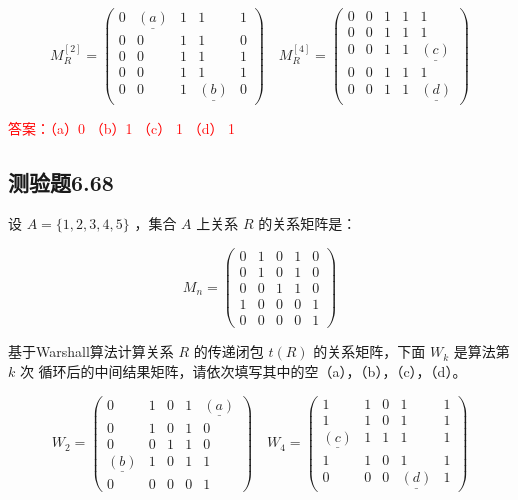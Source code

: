 \documentclass[UTF8, heading=true]{ctexart}
\begin{document}
$$
M_R^{[2]}=\left(\begin{array}{ccccc}
0 & \underline{(a)} & 1 & 1 & 1 \\
0 & 0 & 1 & 1 & 0 \\
0 & 0 & 1 & 1 & 1 \\
0 & 0 & 1 & 1 & 1 \\
0 & 0 & 1 & \underline{(b)} & 0
\end{array}\right) \quad M_R^{[4]}=\left(\begin{array}{ccccc}
0 & 0 & 1 & 1 & 1 \\
0 & 0 & 1 & 1 & 1 \\
0 & 0 & 1 & 1 & \underline{(c)} \\
0 & 0 & 1 & 1 & 1 \\
0 & 0 & 1 & 1 & \underline{(d)}
\end{array}\right)
$$

\textcolor{red}{答案：（a）0 （b）1 （c） 1 （d） 1}

\subsection{测验题6.68}

设 $A=\{1,2,3,4,5\}$ ，集合 $A$ 上关系 $R$ 的关系矩阵是：

$$
M_n=\left(\begin{array}{ccccc}
0 & 1 & 0 & 1 & 0 \\
0 & 1 & 0 & 1 & 0 \\
0 & 0 & 1 & 1 & 0 \\
1 & 0 & 0 & 0 & 1 \\
0 & 0 & 0 & 0 & 1
\end{array}\right)
$$


基于Warshall算法计算关系 $R$ 的传递闭包 $t(R)$ 的关系矩阵，下面 $W_k$ 是算法第 $k$ 次
循环后的中间结果矩阵，请依次填写其中的空（a），（b），（c），（d）。

$$
W_2=\left(\begin{array}{ccccc}
0 & 1 & 0 & 1 & \underline{(a)} \\
0 & 1 & 0 & 1 & 0 \\
0 & 0 & 1 & 1 & 0 \\
\underline{(b)} & 1 & 0 & 1 & 1 \\
0 & 0 & 0 & 0 & 1
\end{array}\right) \quad W_4=\left(\begin{array}{ccccc}
1 & 1 & 0 & 1 & 1 \\
1 & 1 & 0 & 1 & 1 \\
\underline{(c)} & 1 & 1 & 1 & 1 \\
1 & 1 & 0 & 1 & 1 \\
0 & 0 & 0 & \underline{(d)} & 1
\end{array}\right)
$$
\end{document}
